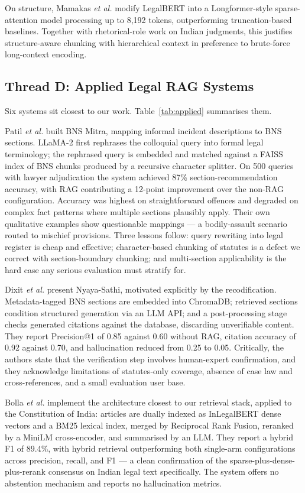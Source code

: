 \documentclass[conference]{IEEEtran}
\begin{document}
On structure, Mamakas \textit{et al.} \cite{mamakas2022} modify LegalBERT into a Longformer-style sparse-attention model processing up to 8{,}192 tokens, outperforming truncation-based baselines. Together with rhetorical-role work on Indian judgments, this justifies structure-aware chunking with hierarchical context in preference to brute-force long-context encoding.

\subsection{Thread D: Applied Legal RAG Systems}

Six systems sit closest to our work. Table~\ref{tab:applied} summarises them.

Patil \textit{et al.} \cite{patil2025} built BNS Mitra, mapping informal incident descriptions to BNS sections. LLaMA-2 first rephrases the colloquial query into formal legal terminology; the rephrased query is embedded and matched against a FAISS index of BNS chunks produced by a recursive character splitter. On 500 queries with lawyer adjudication the system achieved 87\% section-recommendation accuracy, with RAG contributing a 12-point improvement over the non-RAG configuration. Accuracy was highest on straightforward offences and degraded on complex fact patterns where multiple sections plausibly apply. Their own qualitative examples show questionable mappings — a bodily-assault scenario routed to mischief provisions. Three lessons follow: query rewriting into legal register is cheap and effective; character-based chunking of statutes is a defect we correct with section-boundary chunking; and multi-section applicability is the hard case any serious evaluation must stratify for.

Dixit \textit{et al.} \cite{dixit2025} present Nyaya-Sathi, motivated explicitly by the recodification. Metadata-tagged BNS sections are embedded into ChromaDB; retrieved sections condition structured generation via an LLM API; and a post-processing stage checks generated citations against the database, discarding unverifiable content. They report Precision@1 of 0.85 against 0.60 without RAG, citation accuracy of 0.92 against 0.70, and hallucination reduced from 0.25 to 0.05. Critically, the authors state that the verification step involves human-expert confirmation, and they acknowledge limitations of statutes-only coverage, absence of case law and cross-references, and a small evaluation user base.

Bolla \textit{et al.} \cite{bolla2026} implement the architecture closest to our retrieval stack, applied to the Constitution of India: articles are dually indexed as InLegalBERT dense vectors and a BM25 lexical index, merged by Reciprocal Rank Fusion, reranked by a MiniLM cross-encoder, and summarised by an LLM. They report a hybrid F1 of 89.4\%, with hybrid retrieval outperforming both single-arm configurations across precision, recall, and F1 — a clean confirmation of the sparse-plus-dense-plus-rerank consensus on Indian legal text specifically. The system offers no abstention mechanism and reports no hallucination metrics.
\end{document}
